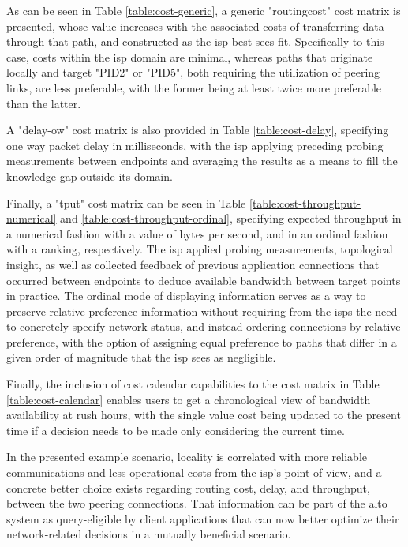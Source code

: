    As can be seen in Table \ref{table:cost-generic}, a generic "routingcost" cost matrix is presented, whose value increases with the associated costs of transferring data through that path, and constructed as the \gls{isp} best sees fit.
    Specifically to this case, costs within the \gls{isp} domain are minimal, whereas paths that originate locally and target "PID2" or "PID5", both requiring the utilization of peering links, are less preferable, with the former being at least twice more preferable than the latter.

    A "delay-ow" cost matrix is also provided in Table \ref{table:cost-delay}, specifying one way packet delay in milliseconds, with the \gls{isp} applying preceding probing measurements between endpoints and averaging the results as a means to fill the knowledge gap outside its domain.

    Finally, a "tput" cost matrix can be seen in Table \ref{table:cost-throughput-numerical} and \ref{table:cost-throughput-ordinal}, specifying expected throughput in a numerical fashion with a value of bytes per second, and in an ordinal fashion with a ranking, respectively.
    The \gls{isp} applied probing measurements, topological insight, as well as collected feedback of previous application connections that occurred between endpoints to deduce available bandwidth between target points in practice.
    The ordinal mode of displaying information serves as a way to preserve relative preference information without requiring from the \gls{isps} the need to concretely specify network status, and instead ordering connections by relative preference, with the option of assigning equal preference to paths that differ in a given order of magnitude that the \gls{isp} sees as negligible.

    Finally, the inclusion of cost calendar capabilities to the cost matrix in Table \ref{table:cost-calendar} enables users to get a chronological view of bandwidth availability at rush hours, with the single value cost being updated to the present time if a decision needs to be made only considering the current time.

    In the presented example scenario, locality is correlated with more reliable communications and less operational costs from the \gls{isp}'s point of view, and a concrete better choice exists regarding routing cost, delay, and throughput, between the two peering connections.
    That information can be part of the \gls{alto} system as query-eligible by client applications that can now better optimize their network-related decisions in a mutually beneficial scenario.


